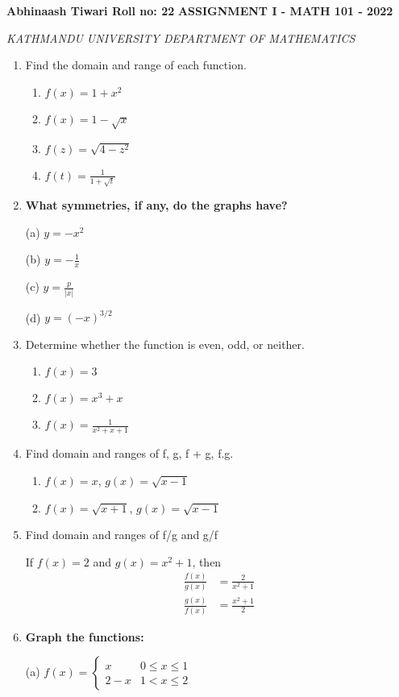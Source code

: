 \documentclass{article}
\begin{document}
\textbf{Abhinaash Tiwari Roll no: 22}
\textbf{ASSIGNMENT I - MATH 101 - 2022}

\textit{KATHMANDU UNIVERSITY DEPARTMENT OF MATHEMATICS}

\begin{enumerate}
\item Find the domain and range of each function.
	\begin{enumerate}
		\item $f(x) = 1 + x^2$
		\item $f(x) = 1 - \sqrt{x}$
		\item $f(z) = \sqrt{4 - z^2}$
		\item $f(t) = \frac{1}{1 + \sqrt{t}}$
	\end{enumerate}
\item \textbf{What symmetries, if any, do the graphs have?}

(a) $y = -x^2$

(b) $y = -\frac{1}{x}$

(c) $y = \frac{p}{|x|}$

(d) $y = (-x)^{3/2}$
\item Determine whether the function is even, odd, or neither.
\begin{enumerate}
\item $f(x) = 3$
\item $f(x) = x^3 + x$
\item $f(x) = \frac{1}{x^2 + x + 1}$
\end{enumerate}
\item Find domain and ranges of f, g, f + g, f.g.
\begin{enumerate}
\item $f(x) = x$, $g(x) = \sqrt{x - 1}$
\item $f(x) = \sqrt{x + 1}$, $g(x) = \sqrt{x - 1}$
\end{enumerate}
\item{Find domain and ranges of f/g and g/f}

If $f(x) = 2$ and $g(x) = x^2 + 1$, then
\begin{align*}
\frac{f(x)}{g(x)} &= \frac{2}{x^2 + 1} \\
\frac{g(x)}{f(x)} &= \frac{x^2 + 1}{2}
\end{align*}

\item \textbf{Graph the functions:}

(a) $f(x) = 
\begin{cases}
x & 0 \leq x \leq 1 \\
2 - x & 1 < x \leq 2
\end{cases}$


\end{enumerate}
\end{document}
